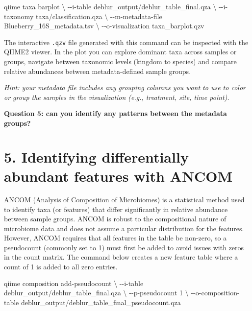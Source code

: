 \documentclass[
]{book}
\newenvironment{Shaded}{\begin{snugshade}}{\end{snugshade}}
\newcommand{\AttributeTok}[1]{\textcolor[rgb]{0.13,0.29,0.53}{#1}}
\newcommand{\DataTypeTok}[1]{\textcolor[rgb]{0.13,0.29,0.53}{#1}}
\newcommand{\ExtensionTok}[1]{#1}
\newcommand{\NormalTok}[1]{#1}
\begin{document}
\begin{Shaded}
\begin{Highlighting}[]
\ExtensionTok{qiime}\NormalTok{ taxa barplot }\DataTypeTok{\textbackslash{}}
  \AttributeTok{{-}{-}i{-}table}\NormalTok{ deblur\_output/deblur\_table\_final.qza }\DataTypeTok{\textbackslash{}}
  \AttributeTok{{-}{-}i{-}taxonomy}\NormalTok{ taxa/classification.qza }\DataTypeTok{\textbackslash{}}
  \AttributeTok{{-}{-}m{-}metadata{-}file}\NormalTok{ Blueberry\_16S\_metadata.tsv }\DataTypeTok{\textbackslash{}}
  \AttributeTok{{-}{-}o{-}visualization}\NormalTok{ taxa\_barplot.qzv}
\end{Highlighting}
\end{Shaded}

The interactive \texttt{.qzv} file generated with this command can be inspected with the QIIME2 viewer. In the plot you can explore dominant taxa across samples or groups, navigate between taxonomic levels (kingdom to species) and compare relative abundances between metadata-defined sample groups.

\emph{Hint: your metadata file includes any grouping columns you want to use to color or group the samples in the visualization (e.g., treatment, site, time point).}

\textbf{Question 5: can you identify any patterns between the metadata groups?}

\section{5. Identifying differentially abundant features with ANCOM}\label{ancom}

\href{https://www.ncbi.nlm.nih.gov/pmc/articles/PMC4450248/}{ANCOM} (Analysis of Composition of Microbiomes) is a statistical method used to identify taxa (or features) that differ significantly in relative abundance between sample groups. ANCOM is robust to the compositional nature of microbiome data and does not assume a particular distribution for the features. However, ANCOM requires that all features in the table be non-zero, so a pseudocount (commonly set to 1) must first be added to avoid issues with zeros in the count matrix. The command below creates a new feature table where a count of 1 is added to all zero entries.

\begin{Shaded}
\begin{Highlighting}[]
\ExtensionTok{qiime}\NormalTok{ composition add{-}pseudocount }\DataTypeTok{\textbackslash{}}
  \AttributeTok{{-}{-}i{-}table}\NormalTok{ deblur\_output/deblur\_table\_final.qza }\DataTypeTok{\textbackslash{}}
  \AttributeTok{{-}{-}p{-}pseudocount}\NormalTok{ 1 }\DataTypeTok{\textbackslash{}}
  \AttributeTok{{-}{-}o{-}composition{-}table}\NormalTok{ deblur\_output/deblur\_table\_final\_pseudocount.qza}
\end{Highlighting}
\end{Shaded}
\end{document}
